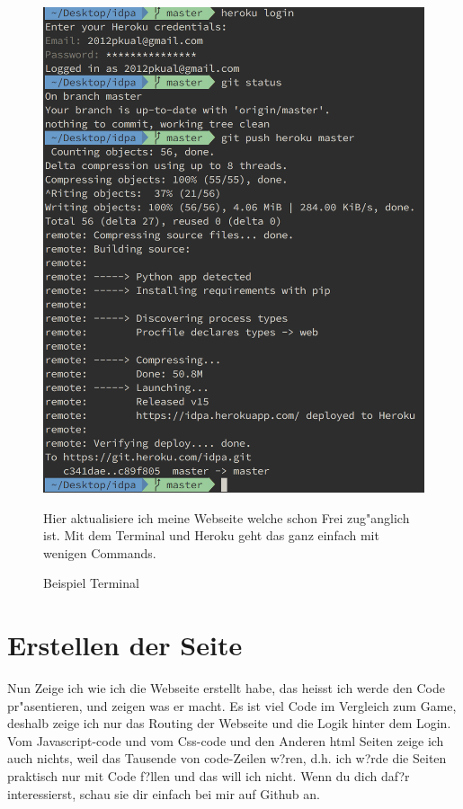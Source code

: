 \documentclass{article}
\begin{document}
            \begin{figure}[ht]
                \centering
                \includegraphics[width=.8\linewidth]{cli-heroku}
                \caption{Beispiel Terminal}
                \label{fig:sub1}{Hier aktualisiere ich meine Webseite welche schon Frei zug"anglich ist.
                Mit dem Terminal und Heroku geht das ganz einfach mit wenigen Commands.}
                \end{figure}
\cleardoublepage










\section{Erstellen der Seite}
Nun Zeige ich wie ich die Webseite erstellt habe, das heisst ich werde den Code pr"asentieren, und zeigen was er macht.
Es ist viel Code im Vergleich zum Game, deshalb zeige ich nur das Routing der Webseite und die Logik hinter dem Login.
Vom Javascript-code und vom Css-code und den Anderen html Seiten zeige ich auch nichts, weil das Tausende von code-Zeilen w?ren, d.h. ich w?rde die Seiten praktisch nur
mit Code f?llen und das will ich nicht. Wenn du dich daf?r interessierst,
schau sie dir einfach bei mir auf Github an.\\
\end{document}
